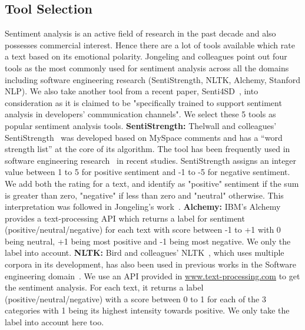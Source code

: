 \subsection{Tool Selection}
Sentiment analysis is an active field of research in the past decade and also possesses commercial interest. Hence there are a lot of tools available which rate a text based on its emotional polarity. Jongeling and colleagues point out four tools as the most commonly used for sentiment analysis across all the domains including software engineering research (SentiStrength, NLTK, Alchemy, Stanford NLP). We also take another tool from a recent paper, Senti4SD~\cite{calefato2017sentiment}, into consideration as it is claimed to be "specifically trained to support sentiment analysis in developers' communication channels". We select these 5 tools as popular sentiment analysis tools.
\newline
\indent \textbf{SentiStrength:} Thelwall and colleagues' SentiStrength~\cite{thelwall2010sentiment} 
was developed based on MySpace comments and 
has a ``word strength list'' at the core of its algorithm. 
The tool has been frequently used in software engineering research~\cite{garcia2013role,guzman2014sentiment,novielli2015challenges,guzman2013towards} in recent studies. SentiStrength assigns an integer value between 1 to 5 for positive sentiment and -1 to -5 for negative sentiment. We add both the rating for a text, and identify as "positive" sentiment if the sum is greater than zero, "negative" if less than zero and "neutral" otherwise. This interpretation was followed in Jongeling's work~\cite{jongeling2017negative}.
\newline
\indent\textbf{Alchemy:} IBM's Alchemy 
provides a text-processing API which returns a label for sentiment (positive/neutral/negative) for each text with score between -1 to +1 with 0 being neutral, +1 being most positive and -1 being most negative. We only the label into account.
\newline
\indent\textbf{NLTK:} Bird and colleagues' NLTK~\cite{bird2009natural}, 
which uses multiple corpora in its development, 
has also been used in previous works 
in the Software engineering domain~\cite{pletea2014security,rousinopoulos2014sentiment}. 
We use an API provided in \href{www.text-processing.com}{www.text-processing.com} to get the sentiment analysis. For each text, it returns a label (positive/neutral/negative) with a score between 0 to 1 for each of the 3 categories with 1 being its highest intensity towards positive. We only take the label into account here too.
